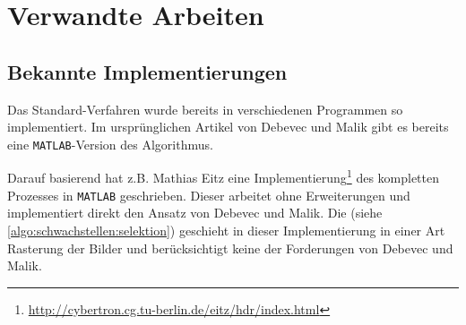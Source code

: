 \chapter{Verwandte Arbeiten}
\label{chap:references}


\section{Bekannte Implementierungen}
Das Standard-Verfahren wurde bereits in verschiedenen Programmen so implementiert. Im ursprünglichen Artikel von Debevec und Malik gibt es bereits eine \texttt{MATLAB}-Version des Algorithmus. 

Darauf basierend hat z.B. Mathias Eitz eine Implementierung\footnote{\url{http://cybertron.cg.tu-berlin.de/eitz/hdr/index.html}} des kompletten Prozesses in \texttt{MATLAB} geschrieben. Dieser arbeitet ohne Erweiterungen und implementiert direkt den Ansatz von Debevec und Malik. Die  (siehe \autoref{algo:schwachstellen:selektion}) geschieht in dieser Implementierung in einer Art Rasterung der Bilder und berücksichtigt keine der Forderungen von Debevec und Malik.
